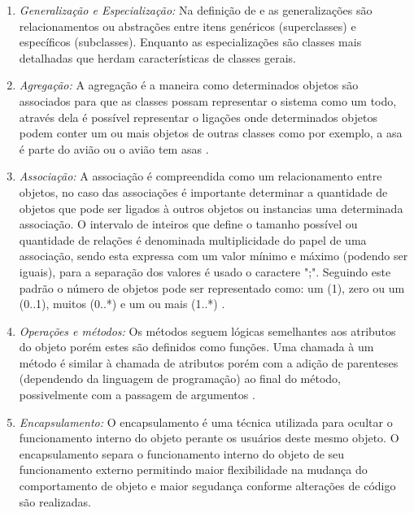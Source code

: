 \begin{enumerate}
\item \textit{Generalização e Especialização:} Na definição de \cite{rumbaugh1991object} e \cite{booch2005unified} as generalizações são relacionamentos ou abstrações entre itens genéricos (superclasses) e específicos (subclasses). Enquanto as especializações são classes mais detalhadas que herdam características de classes gerais.

\item \textit{Agregação:} A agregação é a maneira como determinados objetos são associados para que as classes possam representar o sistema como um todo, através dela é possível representar o ligações onde determinados objetos podem conter um ou mais objetos de outras classes como por exemplo, a asa é parte do avião ou o avião tem asas \cite{rumbaugh1991object}.

\item \textit{Associação:} A associação é compreendida como um relacionamento entre objetos, no caso das associações é importante determinar a quantidade de objetos que pode ser ligados à outros objetos ou instancias uma determinada associação. O intervalo de inteiros que define o tamanho possível ou quantidade de relações é denominada multiplicidade do papel de uma associação, sendo esta expressa com um valor mínimo e máximo (podendo ser iguais), para a separação dos valores é usado o caractere ";". Seguindo este padrão o número de objetos pode ser representado como: um (1), zero ou um (0..1), muitos (0..*) e um ou mais (1..*) \cite{rumbaugh1991object}.


\item \textit{Operações e métodos:}
Os métodos seguem lógicas semelhantes aos atributos do objeto porém estes são definidos como funções. Uma chamada à um método é similar à chamada de atributos porém com a adição de parenteses (dependendo da linguagem de programação) ao final do método, possivelmente com a passagem de argumentos \cite{rumbaugh1991object}.


\item \textit{Encapsulamento:}
O encapsulamento é uma técnica utilizada para ocultar o funcionamento interno do objeto perante os usuários deste mesmo objeto. O encapsulamento separa o funcionamento interno do objeto de seu funcionamento externo permitindo maior flexibilidade na mudança do comportamento de objeto e maior segudança conforme alterações de código são realizadas\cite{rumbaugh1991object}.

\end{enumerate}

